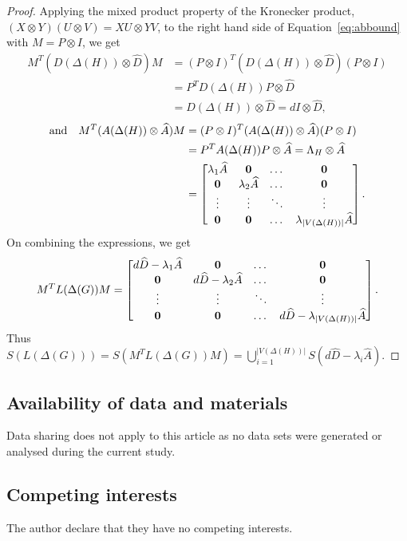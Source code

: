 \documentclass[11pt]{article}
\def \la {{\lambda}}
\begin{document}
\begin{proof}
        Applying the mixed product property of the Kronecker product, 
        $(X\otimes Y)(U\otimes V) = XU\otimes YV$, to the right hand side 
        of Equation~\eqref{eq:abbound} with $M = P\otimes I$, we get
    \begin{align*}
        M^T(D(\Delta(H))\otimes \widehat D)M&=(P\otimes I)^T(D(\Delta(H))\otimes \widehat D)(P\otimes I)\\
        &=P^TD(\Delta(H))P\otimes \widehat D\\
        &=D(\Delta(H))\otimes \widehat D=d I\otimes \widehat D,
    \end{align*}
    \begin{align*}
      \text{and}\quad  M^T(A(\Delta(H))\otimes \widehat A)M&=(P\otimes I)^T(A(\Delta(H))\otimes \widehat A)(P\otimes I)\\
        &=P^TA(\Delta(H))P\otimes \widehat A=\Lambda_H\otimes \widehat A\\
        &=\begin{bmatrix}
            \la_1\widehat A&\bf 0&\dots &\bf 0\\
            \bf 0&\la_2\widehat A&\dots &\bf 0\\
            \vdots&\vdots&\ddots&\vdots\\
        \bf 0&\bf 0&\dots&\la_{|V(\Delta(H))|}\widehat A
        \end{bmatrix}.
    \end{align*}
    On combining the expressions, we get
    $$M^TL(\Delta(G)) M=\begin{bmatrix}
        d\widehat D-\la_1\widehat A&\bf 0&\dots &\bf 0\\
    \bf 0&d\widehat D-\la_2\widehat A&\dots &\bf 0\\
    \vdots&\vdots&\ddots&\vdots\\
    \bf 0&\bf 0&\dots&d\widehat D-\la_{|V(\Delta(H))|}\widehat A \end{bmatrix}.$$
    Thus $S(L(\Delta(G)))=S(M^TL(\Delta(G))M)=\bigcup\limits_{i=1}^{|V(\Delta(H))|}S(d \widehat D-\la_i\widehat A).$
    \end{proof}


\subsection*{Availability of data and materials} Data sharing does not apply to this article as no data sets
were generated or analysed during the current study.
\subsection* {Competing interests} The author declare that they have no competing interests.

  






 





 
 
\end{document}
